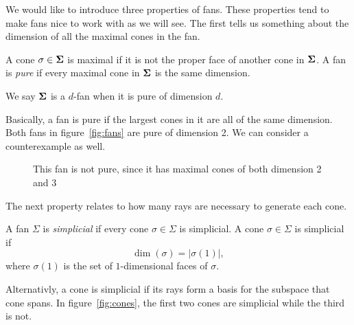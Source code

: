 \documentclass[12pt,oneside]{../../sfsuthesis}
\begin{document}
We would like to introduce three properties of fans.
These properties tend to make fans nice to work with as we will see.
The first tells us something about the dimension of all the maximal cones in the fan.
\begin{definition}[Pure]\th\label{def:pure}
    A cone \(\sigma \in \bm{\Sigma} \) is maximal if it is not the proper face of another cone in \( \bm{\Sigma} \).
    A fan is \emph{pure} if every maximal cone in \( \bm{\Sigma} \) is the same dimension.

    We say \( \bm{\Sigma} \) is a \( d \)-fan when it is pure of dimension \( d \).
\end{definition}
Basically, a fan is pure if the largest cones in it are all of the same dimension.
Both fans in figure~\ref{fig:fans} are pure of dimension 2.
We can consider a counterexample as well.
\begin{figure}[H]
    \centering
    \caption{This fan is not pure, since it has maximal cones of both dimension 2 and 3}
\end{figure}
The next property relates to how many rays are necessary to generate each cone.
\begin{definition}[Simplicial]\th\label{def:simplicial}
    A fan \( \Sigma \) is \emph{simplicial} if every cone \( \sigma \in \Sigma \) is simplicial.
    A cone \( \sigma \in \Sigma \) is simplicial if
    \[
        \dim (\sigma)  = |\sigma(1)|,
    \]
    where \( \sigma(1) \) is the set of \( 1 \)-dimensional faces of \( \sigma \).
\end{definition}
Alternativly, a cone is simplicial if its rays form a basis for the subspace that cone spans.
In figure~\ref{fig:cones}, the first two cones are simplicial while the third is not.
\end{document}

